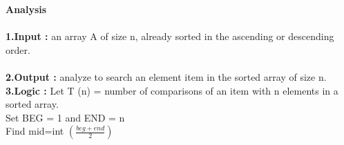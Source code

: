\documentclass{article}
\begin{document}
\textbf{\huge Analysis}\\
\\
\textbf{1.Input : }an array A of size n, already sorted in the ascending or descending order.\\
\\
\textbf{2.Output : } analyze to search an element item in the sorted array of size n.\\
\textbf{3.Logic : }Let T (n) = number of comparisons of an item with n elements in a sorted array.\\

 Set BEG = 1 and END = n\\
 Find mid=int $(\frac{beg+end}{2})$\\
\end{document}
